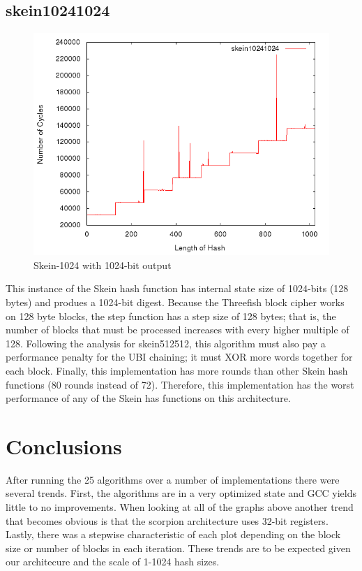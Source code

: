 \documentclass[10pt,a4paper]{article}
\begin{document}
\subsection{skein10241024}
    \begin{figure}[H]
        \begin{center}
            \includegraphics[scale=0.5]{images/skein10241024.png} 
            \caption{Skein-1024 with 1024-bit output}
        \end{center}
    \end{figure}

This instance of the Skein hash function has internal state size of 1024-bits (128 bytes) and produes a 1024-bit digest.  Because the Threefish block cipher works on 128 byte blocks, the step function has a step size of 128 bytes; that is, the number of blocks that must be processed increases with every higher multiple of 128.  Following the analysis for skein512512, this algorithm must also pay a performance penalty for the UBI chaining; it must XOR more words together for each block.  Finally, this implementation has more rounds than other Skein hash functions (80 rounds instead of 72).  Therefore, this implementation has the worst performance of any of the Skein has functions on this architecture.

\section*{Conclusions}
After running the 25 algorithms over a number of implementations there were several trends. First, the algorithms are in a very optimized state and 
GCC yields little to no improvements. When looking at all of the graphs above another trend that becomes obvious is that the scorpion architecture uses 
32-bit registers. Lastly, there was a stepwise characteristic of each plot depending on the block size or number of blocks in each iteration. These trends
are to be expected given our architecure and the scale of 1-1024 hash sizes.

{}

\end{document}
